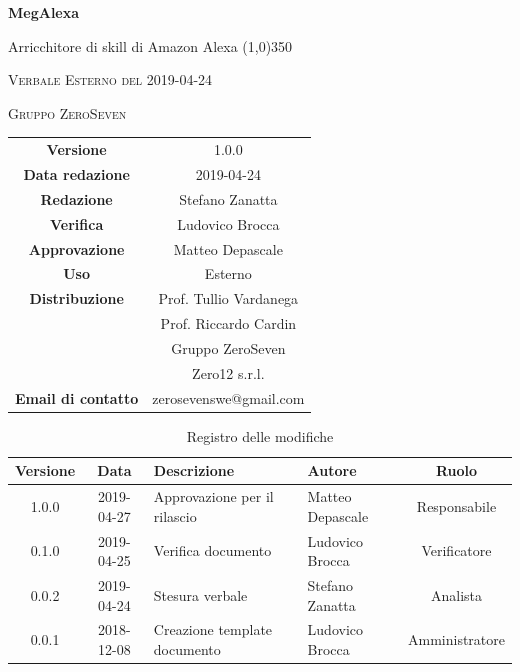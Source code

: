 \documentclass[a4paper,12pt]{article}
\author{Stefano Zanatta}
\date{2019-04-24}
\begin{document}
	\begin{titlepage}
		\centering
		{\huge\bfseries MegAlexa\par}
		Arricchitore di skill di Amazon Alexa
		\line(1,0){350} \\
		{\scshape\LARGE Verbale Esterno del 2019-04-24 \par}
		\vspace{1cm}
		{\scshape Gruppo ZeroSeven \par}
		\logo
		\begin{tabular}{c|c}
			{\hfill \textbf{Versione}} 			& 1.0.0			\\
			{\hfill\textbf{Data redazione}} 	& 2019-04-24\\ 
			{\hfill\textbf{Redazione}} 			&  Stefano Zanatta	\\ 
			{\hfill\textbf{Verifica}} 				&  	  Ludovico Brocca\\ 
			{\hfill\textbf{Approvazione}} 		&  	Matteo Depascale \\ 
			{\hfill\textbf{Uso}} 					& 	Esterno	\\ 
			{\hfill\textbf{Distribuzione}} 			& 			Prof. Tullio Vardanega \\ & Prof. Riccardo Cardin \\ & Gruppo ZeroSeven \\ & Zero12 s.r.l.	\\ 
			{\hfill\textbf{Email di contatto}} & zerosevenswe@gmail.com \\
		\end{tabular}
	\end{titlepage}
	
	
	
	\label{LastFrontPage}
	
	
	\newpage
	\cleardoublepage
	\begin{table}[tbph]
		\centering
		\begin{tabularx}{\textwidth}{|c|c|X|X|c|}
			\hline
			\textbf{Versione} & \textbf{Data} & \textbf{Descrizione} & \textbf{Autore} & \textbf{Ruolo} \\
			\hline
			1.0.0 & 2019-04-27 & Approvazione per il rilascio &Matteo Depascale & Responsabile \\
			\hline
			0.1.0 & 2019-04-25 & Verifica documento & Ludovico Brocca & Verificatore \\
			\hline
			0.0.2 & 2019-04-24 & Stesura verbale &Stefano Zanatta & Analista \\
			\hline
			0.0.1 & 2018-12-08 & Creazione template documento & Ludovico Brocca & Amministratore\\
			\hline
		\end{tabularx}
		\caption{Registro delle modifiche}
	\end{table}
	\cleardoublepage
	\pagestyle{mymain}
	
\end{document}
